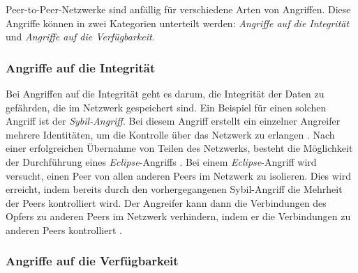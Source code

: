 Peer-to-Peer-Netzwerke sind anfällig für verschiedene Arten von Angriffen. Diese Angriffe können in zwei Kategorien unterteilt werden: \textit{Angriffe auf die Integrität} und \textit{Angriffe auf die Verfügbarkeit}.

\subsubsection{Angriffe auf die Integrität}
\label{subsubsec:sybil_or_eclipse_attack_p2p}

Bei Angriffen auf die Integrität geht es darum, die Integrität der Daten zu gefährden, die im Netzwerk gespeichert sind. Ein Beispiel für einen solchen Angriff ist der \textit{Sybil-Angriff}. Bei diesem Angriff erstellt ein einzelner Angreifer mehrere Identitäten, um die Kontrolle über das Netzwerk zu erlangen \parencite[S. 251]{Douceur_SybilAttack}. Nach einer erfolgreichen Übernahme von Teilen des Netzwerks, besteht die Möglichkeit der Durchführung eines \textit{Eclipse}-Angriffs \parencite[S. 13-15]{Baptiste_AttacksOnP2PNetworks}. Bei einem \textit{Eclipse}-Angriff wird versucht, einen Peer von allen anderen Peers im Netzwerk zu isolieren. Dies wird erreicht, indem bereits durch den vorhergegangenen Sybil-Angriff die Mehrheit der Peers kontrolliert wird. Der Angreifer kann dann die Verbindungen des Opfers zu anderen Peers im Netzwerk verhindern, indem er die Verbindungen zu anderen Peers kontrolliert \Parencite[S. 14]{Baptiste_AttacksOnP2PNetworks}. 


\subsubsection{Angriffe auf die Verfügbarkeit}
\label{subsubsec:denial_of_service_attack_p2p}

